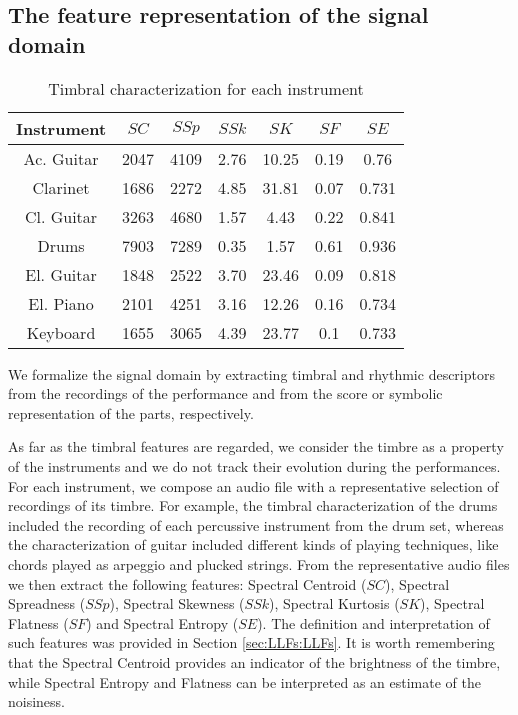 \subsection{The feature representation of the signal domain}\label{sec:NMP:domain}

\begin{table}[tb]
  \caption{Timbral characterization for each instrument}
  \centering %
  \label{tab:NMP:instruments}
  \bgroup
  \def\arraystretch{1.5}
\begin{tabular}{||c|c|c|c|c|c|c||}
 \hline
 \hline
 Instrument  & $SC$ & $SSp$ & $SSk$ & $SK$ & $SF$ & $SE$ \\
 \hline
 \hline
Ac. Guitar &   2047 & 4109 & 2.76 & 10.25 & 0.19 & 0.76 \\
Clarinet & 1686 & 2272 & 4.85 & 31.81 & 0.07 & 0.731 \\
Cl. Guitar &   3263 & 4680 & 1.57 & 4.43 & 0.22 & 0.841 \\
Drums & 7903 & 7289 & 0.35 & 1.57 & 0.61 & 0.936 \\
El. Guitar & 1848 & 2522 & 3.70 & 23.46 & 0.09 & 0.818 \\
El. Piano & 2101 & 4251 & 3.16 & 12.26 & 0.16 & 0.734 \\
Keyboard & 1655 & 3065 & 4.39 & 23.77 & 0.1 & 0.733 \\
 \hline
 \hline
   \end{tabular}
   \egroup
\end{table}

We formalize the signal domain by extracting timbral and rhythmic descriptors from the recordings of the performance and from the score or symbolic representation of the parts, respectively. 

As far as the timbral features are regarded, we consider the timbre as a property of the instruments and we do not track their evolution during the performances. For each instrument, we compose an audio file with a representative selection of recordings of its timbre. For example, the timbral characterization of the drums included the recording of each percussive instrument from the drum set, whereas the characterization of guitar included different kinds of playing techniques, like chords played as arpeggio and plucked strings. From the representative audio files we then extract the following features: Spectral Centroid ($SC$), Spectral Spreadness ($SSp$), Spectral Skewness ($SSk$), Spectral Kurtosis ($SK$), Spectral Flatness ($SF$) and Spectral Entropy ($SE$). The definition and interpretation of such features was provided in Section \ref{sec:LLFs:LLFs}. It is worth remembering that the Spectral Centroid provides an indicator of the brightness of the timbre, while Spectral Entropy and Flatness can be interpreted as an estimate of the noisiness. 

